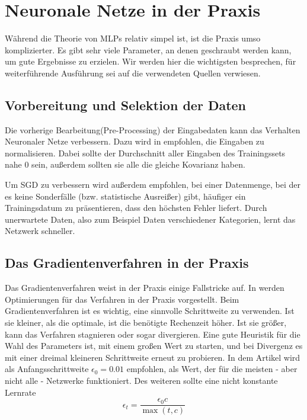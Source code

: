 \section{Neuronale Netze in der Praxis}
Während die Theorie von MLPs relativ simpel ist, ist die Praxis umso komplizierter. Es gibt sehr viele Parameter, an denen geschraubt werden kann, um gute Ergebnisse zu erzielen. Wir werden hier die wichtigsten besprechen, für weiterführende Ausführung sei auf die verwendeten Quellen verwiesen. 

\subsection{Vorbereitung und Selektion der Daten}
Die vorherige Bearbeitung(Pre-Processing) der Eingabedaten kann das Verhalten Neuronaler Netze verbessern. 
Dazu wird in \cite{lecunefficient} empfohlen, die Eingaben zu normalisieren.
Dabei sollte der Durchschnitt aller Eingaben des Trainingssets nahe $0$ sein, außerdem sollten sie alle die gleiche Kovarianz haben.

Um SGD zu verbessern wird außerdem empfohlen, bei einer Datenmenge, bei der es keine Sonderfälle (bzw. statistische Ausreißer) gibt, häufiger ein Trainingsdatum zu präsentieren, dass den höchsten Fehler liefert. Durch unerwartete Daten, also zum Beispiel Daten verschiedener Kategorien, lernt das Netzwerk schneller.

\subsection{Das Gradientenverfahren in der Praxis}
Das Gradientenverfahren weist in der Praxis einige Fallstricke auf. In \cite{bengio2012practical} werden Optimierungen für das Verfahren in der Praxis vorgestellt. 
Beim Gradientenverfahren ist es wichtig, eine sinnvolle Schrittweite zu verwenden. Ist sie kleiner, als die optimale, ist die benötigte Rechenzeit höher. Ist sie größer, kann das Verfahren stagnieren oder sogar divergieren. Eine gute Heuristik für die Wahl des Parameters ist, mit einem großen Wert zu starten, und bei Divergenz es mit einer dreimal kleineren Schrittweite erneut zu probieren.
In dem Artikel wird als Anfangsschrittweite $\epsilon_0 = 0.01$ empfohlen, als Wert, der für die meisten - aber nicht alle - Netzwerke funktioniert.
Des weiteren sollte eine nicht konstante Lernrate 
\begin{equation}
	\epsilon_t = \frac{\epsilon_0 c}{\max(t, c)}
\end{equation}

